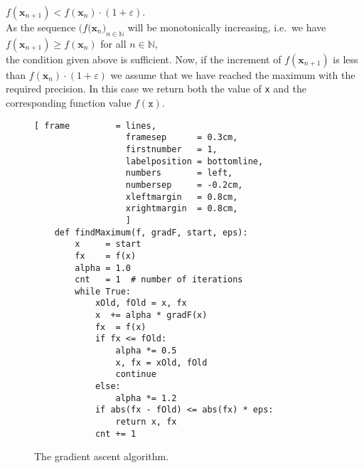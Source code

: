 \begin{enumerate}
      $f(\mathbf{x}_{n+1}) < f(\mathbf{x}_{n}) \cdot (1 + \varepsilon)$.
      \\[0.2cm]
      As the sequence $\bigl(f(\mathbf{x}_n\bigr)_{n\in\mathbb{N}}$ will be monotonically
      increasing, i.e.~we have
      \\[0.2cm]
      \hspace*{1.3cm}
      $f(\mathbf{x}_{n+1}) \geq f(\mathbf{x}_{n})$ \quad for all $n\in\mathbb{N}$,
      \\[0.2cm]
      the condition given above is sufficient.  Now, if the increment of  $f(\mathbf{x}_{n+1})$ is less than $f(\mathbf{x}_{n}) \cdot (1 + \varepsilon)$ 
      we assume that we have reached the maximum with the required precision.  In this case we return both the
      value of \texttt{x} and the corresponding function value $f(\mathtt{x})$.
\end{enumerate}

\begin{figure}[!ht]
\centering
\begin{Verbatim}[ frame         = lines, 
                  framesep      = 0.3cm, 
                  firstnumber   = 1,
                  labelposition = bottomline,
                  numbers       = left,
                  numbersep     = -0.2cm,
                  xleftmargin   = 0.8cm,
                  xrightmargin  = 0.8cm,
                  ]
    def findMaximum(f, gradF, start, eps):
        x     = start
        fx    = f(x)
        alpha = 1.0
        cnt   = 1  # number of iterations
        while True:
            xOld, fOld = x, fx
            x  += alpha * gradF(x)
            fx  = f(x)
            if fx <= fOld:   
                alpha *= 0.5
                x, fx = xOld, fOld
                continue
            else:
                alpha *= 1.2
            if abs(fx - fOld) <= abs(fx) * eps:
                return x, fx
            cnt += 1                  
\end{Verbatim}
\vspace*{-0.3cm}
\caption{The gradient ascent algorithm.}
\label{fig:gradient-ascent.py}
\end{figure}

